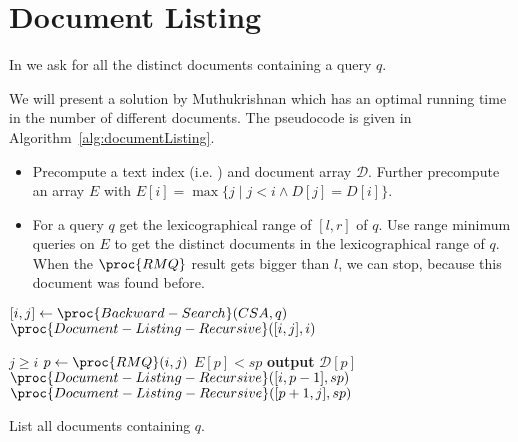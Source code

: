 \section{Document Listing}
\label{sec:documentListing}

\begin{Definition}
  In  we ask for all the distinct documents containing a query $q$.
\end{Definition}

We will present a solution by Muthukrishnan \cite{Muthukrishnan2002} which has an optimal running time in the number of different documents. The pseudocode is given in Algorithm~\ref{alg:documentListing}.
\begin{itemize}
  \item Precompute a text index (i.e. ) and document array $\mathcal{D}$. Further precompute an array $E$ with $E[i] = \max \{j \mid j < i \land D[j] = D[i]\}$.
  \item For a query $q$ get the lexicographical range of $[l,r]$ of $q$. Use range minimum queries on $E$ to get the distinct documents in the lexicographical range of $q$. When the $\proc{RMQ}$ result gets bigger than $l$, we can stop, because this document was found before.
\end{itemize}

\begin{algorithm}[htb]
  \begin{codebox}
    \li $[i,j] \gets \proc{Backward-Search}(CSA, q)$
    \li $\proc{Document-Listing-Recursive}([i,j], i)$
  \end{codebox}
  \vspace{2mm}
  \begin{codebox}
    \li \If $j \geq i$
        \Then
    \li   $p \gets \proc{RMQ}(i,j)$
    \li   \If $E[p] < sp$
          \Then
    \li     \textbf{output} $\mathcal{D}[p]$ 
          \End
    \li   $\proc{Document-Listing-Recursive}([i, p-1], sp)$
    \li   $\proc{Document-Listing-Recursive}([p+1, j], sp)$
        \End
  \end{codebox}
  \caption{List all documents containing $q$.}
  \label{alg:documentListing}
\end{algorithm}

